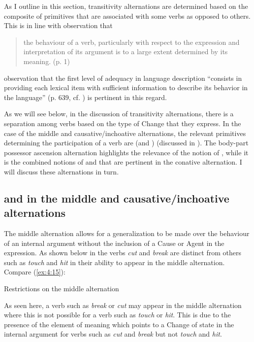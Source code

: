 As I outline in this section, transitivity alternations are determined
based on the composite of primitives that are associated with some
verbs as opposed to others. This is in line with 
observation that

\begin{quote}
the behaviour of a verb, particularly with respect to the expression
and interpretation of its argument is to a large extent determined by
its meaning. (p. 1)
\end{quote}

 observation that the first level of adequacy
in language description “consists in providing each lexical item with
sufficient information to describe its behavior in the language”
(p. 639, cf. \citealt{Chomsky1965}) is pertinent in this regard.

As we will see below, in the discussion of transitivity alternations,
there is a separation among verbs based on the type of Change that
they express.  In the case of the middle and causative\slash inchoative
alternations, the relevant primitives determining the participation of
a verb are \BECOME (and \CAUSE) (discussed in ).  The
body-part possessor ascension alternation highlights the relevance of
the notion of \CONTACT, while it is the combined notions of \MOTION and
\CONTACT that are pertinent in the conative alternation. I will discuss
these alternations in turn.


\subsection{\CAUSE and \BECOME in the middle and causative/inchoative
  alternations}\label{sec:4.4.1}

The middle alternation allows for a generalization to be made over the
behaviour of an internal argument without the inclusion of a Cause or
Agent in the expression.  As shown below in  the verbs
\textit{cut} and \textit{break} are distinct from others such as \textit{touch} and \textit{hit}
in their ability to appear in the middle alternation.  Compare (\ref{ex:4:15}):

\ea\label{ex:4:15} Restrictions on the middle alternation \citep[6, example 13]{Levin1993}\\
\z \z

As seen here, a verb such as \textit{break} or \textit{cut} may appear in the middle
alternation where this is not possible for a verb such as \textit{touch} or
\textit{hit}.  This is due to the presence of the element of meaning \BECOME
which points to a Change of state in the internal argument for verbs
such as \textit{cut} and \textit{break} but not \textit{touch} and \textit{hit}.

